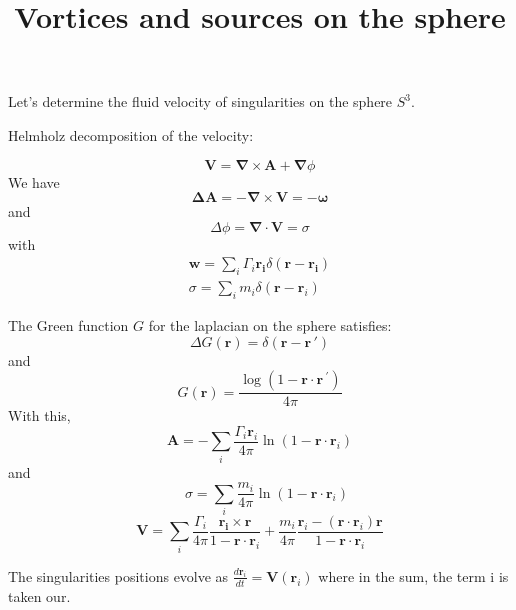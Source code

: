 \documentclass[12pt]{article}
\renewcommand{\vec}{\mathbf}
\renewcommand{\overrightarrow}{\mathbf}
\begin{document}
\title{Vortices and sources on the sphere}
\maketitle

Let's determine the fluid velocity of singularities on the sphere $S^{3}$.

Helmholz decomposition of the velocity:

\[\vec{V}=\vec{\nabla} \times \vec{A}+\vec{\nabla} \phi\]
We have
\[\vec{\Delta} \vec{A}=-\vec{\nabla} \times \vec{V}=-\vec{\omega}\]
and
\[\Delta \phi=\vec{\nabla} \cdot \vec{V}=\sigma\]
with
\[\begin{aligned}
 \vec{w}=\sum_{i} \Gamma_{i} \overrightarrow{r_{i}} \delta\left(\vec{r}-\overrightarrow{r_{i}}\right) \\
\sigma =\sum_i m_{i} \delta\left(\vec{r}-\vec{r}_{i}\right)
\end{aligned}\]

The Green function $G$ for the laplacian on the sphere satisfies:
$$
\Delta G(\vec{r})=\delta\left(\vec{r}-\vec{r}\,'\right)
$$
and
$$
G(\vec{r})=\frac{\log \left(1-\vec{r} \cdot \vec{r}\,^{\prime}\right)}{4 \pi}
$$
With this,
$$
 \vec{A}=-\sum_{i} \frac{\Gamma_{i} \vec{r}_{i}}{4 \pi} \ln (1-\vec{r} \cdot \vec{r}_i) 
$$
and
$$
 \quad \sigma=\sum_{i} \frac{m_{i}}{4\pi} \ln (1-\vec{r}\cdot \vec{r}_i)
$$
 $$\vec{V}=\sum_{i} \frac{\Gamma_{i}}{4 \pi} \frac{\overrightarrow{r_{i}} \times \vec{r}}{1-\vec{r} \cdot \vec{r}_{i}}+\frac{m_{i}}{4 \pi} \frac{\vec{r}_{i}-\left(\vec{r}\cdot \vec{r}_{i}\right) \vec{r}}{1-\vec{r}\cdot \vec{r}_{i}}$$

The singularities positions evolve as $\frac{d \vec{r}_{i}}{d t}=\vec{V}(\vec{r}_i)$ where in the sum, the term i is taken our.
\end{document}

